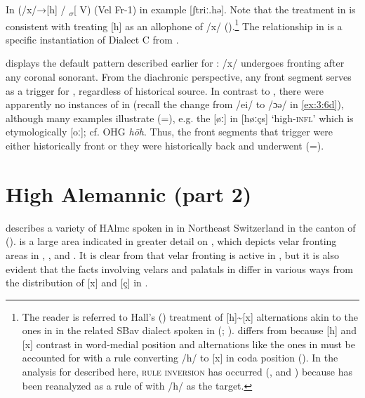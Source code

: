 In   (/x/→[h] / \textsubscript{${\sigma}$}[ {\longrule}V)   (Vel Fr-1) in example [ʃtriː.hə]. Note that the treatment in  is consistent with treating [h] as an allophone of /x/ ().\footnote{{The reader is referred to Hall’s (\citeyear{Hall2009a,Hall2010,Hall2011a}) treatment of [h]{\textasciitilde}[x] alternations akin to the ones in  in the related SBav dialect spoken in  (\citealt{Schatz1897}; ).  differs from  because [h] and [x] contrast in word-medial position and alternations like the ones in  must be accounted for with a rule converting /h/ to [x] in coda position (). In the analysis for  described here,} {\textsc{rule} \textsc{inversion}} {has occurred (\citealt{Vennemann1972}, \citealt{Hall2009a} and ) because  has been reanalyzed as a rule of  with /h/ as the target.}} The  relationship in  is a specific instantiation of Dialect C from .

 displays the default pattern described earlier for : /x/ undergoes fronting after any coronal sonorant. From the diachronic perspective, any front segment serves as a trigger for , regardless of historical source. In contrast to , there were apparently no instances of  in  (recall the change from /ei/ to /ɔə/ in \ref{ex:3:6d}), although many examples illustrate  (=), e.g. the [øː] in [høːçs] ‘high-\textsc{infl}’ which is etymologically [oː]; cf. OHG \textit{hōh}. Thus, the front segments that trigger  were either historically front or they were historically back and underwent  (=).

\section{{High} {Alemannic} {(part} {2)} }\label{sec:3.4}

\citet{Berger1913} describes a variety of HAlmc spoken in  in Northeast Switzerland in the canton of  ().  is a large area indicated in greater detail on , which depicts velar fronting areas in , , and . It is clear from \citet{Berger1913} that velar fronting is active in , but it is also evident that the facts involving velars and palatals in  differ in various ways from the distribution of [x] and [ç] in .

